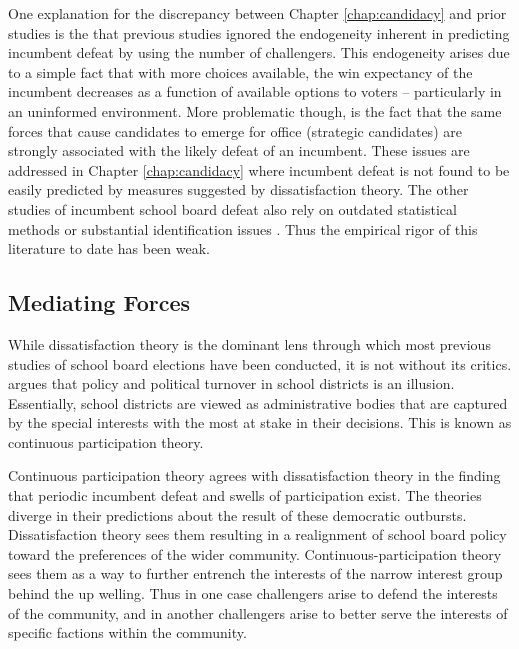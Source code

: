 One explanation for the discrepancy between Chapter \ref{chap:candidacy} and prior 
studies is the that previous studies ignored the endogeneity inherent 
in predicting incumbent defeat by using the number of challengers. This 
endogeneity arises due to a simple fact that with more choices available, the 
win expectancy of the incumbent decreases as a function of available options to 
voters -- particularly in an uninformed environment. More problematic though, is 
the fact that the same forces that cause candidates to emerge for office 
(strategic candidates) are strongly associated with the likely defeat of an 
incumbent. These issues are addressed in Chapter \ref{chap:candidacy} where 
incumbent defeat is not found to be easily predicted by measures suggested by 
dissatisfaction theory. The other studies of incumbent school board defeat also 
rely on outdated statistical methods or substantial identification issues 
\citep{RefWorks:311,RefWorks:245,RefWorks:247,RefWorks:341}. Thus the empirical 
rigor of this literature to date has been weak. 


\subsection{Mediating Forces}
 
While dissatisfaction theory is the dominant lens through which most previous 
studies of school board elections have been conducted, it is not without its 
critics. \citet{RefWorks:281} argues that policy and political turnover in 
school districts is an illusion. Essentially, school districts are viewed as 
administrative bodies that are captured by the special interests with the most 
at stake in their decisions. This is known as continuous participation theory. 

Continuous participation theory agrees with dissatisfaction theory in the finding 
that periodic incumbent defeat and swells of participation exist. The theories 
diverge in their predictions about the result of these democratic outbursts. 
Dissatisfaction theory sees them resulting in a realignment of school board policy 
toward the preferences of the wider community. Continuous-participation theory 
sees them as a way to further entrench the interests of the narrow interest 
group behind the up welling. Thus in one case challengers arise to defend the 
interests of the community, and in another challengers arise to better serve 
the interests of specific factions within the community. 

